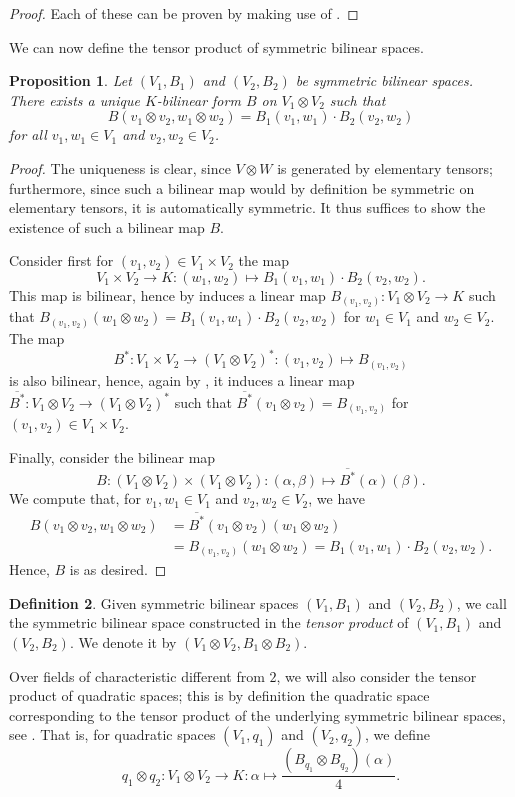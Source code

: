\documentclass[12pt, leqno, british]{amsart}
\theoremstyle{definition}
\newtheorem{defi}{Definition}[subsection]
\theoremstyle{plain}
\newtheorem{prop}[defi]{Proposition}
\theoremstyle{remark}
\newcommand{\ovl}{\overline}
\begin{document}
\begin{proof}
Each of these can be proven by making use of .
\end{proof}
We can now define the tensor product of symmetric bilinear spaces.
\begin{prop}\label{P:tensor-product-SBS}
Let $(V_1, B_1)$ and $(V_2, B_2)$ be symmetric bilinear spaces.
There exists a unique $K$-bilinear form $B$ on $V_1 \otimes V_2$ such that
$$ B(v_1 \otimes v_2, w_1 \otimes w_2) = B_1(v_1,w_1) \cdot B_2(v_2, w_2) $$
for all $v_1, w_1 \in V_1$ and $v_2, w_2 \in V_2$.
\end{prop}
\begin{proof}
The uniqueness is clear, since $V \otimes W$ is generated by elementary tensors; furthermore, since such a bilinear map would by definition be symmetric on elementary tensors, it is automatically symmetric.
It thus suffices to show the existence of such a bilinear map $B$.

Consider first for $(v_1, v_2) \in V_1 \times V_2$ the map
$$ V_1 \times V_2 \to K : (w_1, w_2) \mapsto B_1(v_1, w_1) \cdot B_2(v_2, w_2). $$
This map is bilinear, hence by  induces a linear map $B_{(v_1, v_2)} : V_1 \otimes V_2 \to K$ such that $B_{(v_1, v_2)}(w_1 \otimes w_2) = B_1(v_1, w_1) \cdot B_2(v_2, w_2)$ for $w_1 \in V_1$ and $w_2 \in V_2$.
The map
$$ B^\ast : V_1 \times V_2 \to (V_1 \otimes V_2)^\ast : (v_1, v_2) \mapsto B_{(v_1, v_2)}$$
is also bilinear, hence, again by , it induces a linear map $\ovl{B^\ast} : V_1 \otimes V_2 \to (V_1 \otimes V_2)^\ast$ such that $\ovl{B^\ast}(v_1 \otimes v_2) = B_{(v_1, v_2)}$ for $(v_1, v_2) \in V_1 \times V_2$.

Finally, consider the bilinear map
$$ B : (V_1 \otimes V_2) \times (V_1 \otimes V_2) : (\alpha, \beta) \mapsto \ovl{B^\ast}(\alpha)(\beta).$$
We compute that, for $v_1, w_1 \in V_1$ and $v_2, w_2 \in V_2$, we have
\begin{align*}
B(v_1 \otimes v_2, w_1 \otimes w_2) &= \ovl{B^\ast}(v_1 \otimes v_2)(w_1 \otimes w_2) \\
&= B_{(v_1, v_2)}(w_1 \otimes w_2) = B_1(v_1, w_1) \cdot B_2(v_2, w_2).
\end{align*}
Hence, $B$ is as desired.
\end{proof}
\begin{defi}
Given symmetric bilinear spaces $(V_1, B_1)$ and $(V_2, B_2)$, we call the symmetric bilinear space constructed in  the \emph{tensor product} of $(V_1, B_1)$ and $(V_2, B_2)$.
We denote it by $(V_1 \otimes V_2, B_1 \otimes B_2)$.

Over fields of characteristic different from $2$, we will also consider the tensor product of quadratic spaces; this is by definition the quadratic space corresponding to the tensor product of the underlying symmetric bilinear spaces, see .
That is, for quadratic spaces $(V_1, q_1)$ and $(V_2, q_2)$, we define
$$ q_1 \otimes q_2 : V_1 \otimes V_2 \to K : \alpha \mapsto \frac{(B_{q_1} \otimes B_{q_2})(\alpha)}{4}. $$
\end{defi}
\end{document}
